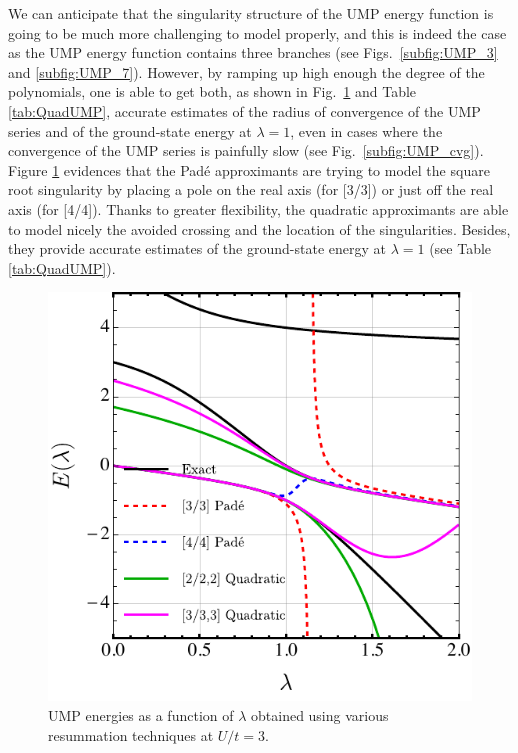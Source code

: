 \documentclass[aps,prb,reprint,noshowkeys,superscriptaddress]{revtex4-1}
\begin{document}
We can anticipate that the singularity structure of the UMP energy function is going to be much more challenging to model properly, and this is indeed the case as the UMP energy function contains three branches (see Figs.~\ref{subfig:UMP_3} and \ref{subfig:UMP_7}).
However, by ramping up high enough the degree of the polynomials, one is able to get both, as shown in Fig.~\ref{fig:QuadUMP} and Table \ref{tab:QuadUMP}, accurate estimates of the radius of convergence of the UMP series and of the ground-state energy at $\lambda = 1$, even in cases where the convergence of the UMP series is painfully slow (see Fig.~\ref{subfig:UMP_cvg}).
Figure \ref{fig:QuadUMP} evidences that the Pad\'e approximants are trying to model the square root singularity by placing a pole on the real axis (for [3/3]) or just off the real axis (for [4/4]).
Thanks to greater flexibility, the quadratic approximants are able to model nicely the avoided crossing and the location of the singularities. 
Besides, they provide accurate estimates of the ground-state energy at $\lambda = 1$ (see Table \ref{tab:QuadUMP}).

\begin{figure}
    \includegraphics[width=\linewidth]{QuadUMP}
    \caption{\label{fig:QuadUMP}
    UMP energies as a function of $\lambda$ obtained using various resummation techniques at $U/t = 3$.}
\end{figure}
\end{document}
